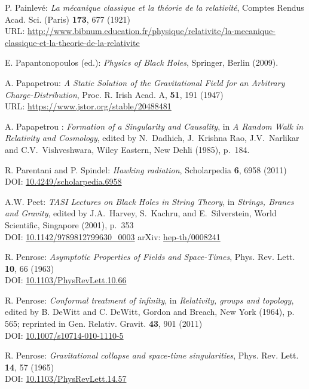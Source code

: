 \begin{thebibliography}{123}
P. Painlevé: \emph{La mécanique classique et la théorie de la relativité},
Comptes Rendus Acad. Sci. (Paris) {\bf 173}, 677 (1921)\\
URL: \url{http://www.bibnum.education.fr/physique/relativite/la-mecanique-classique-et-la-theorie-de-la-relativite}

E. Papantonopoulos (ed.): {\em Physics of Black Holes}, Springer, Berlin (2009).

A. Papapetrou:
{\em A Static Solution of the Gravitational Field for an Arbitrary Charge-Distribution},
Proc. R. Irish Acad. A, {\bf 51}, 191 (1947)\\
URL: \url{https://www.jstor.org/stable/20488481}

A. Papapetrou : {\em Formation of a Singularity and Causality},
in {\em A Random Walk in Relativity and Cosmology},
edited by N.~Dadhich, J.~Krishna Rao, J.V.~Narlikar and C.V.~Vishveshwara,
Wiley Eastern, New Dehli (1985), p.~184.

R. Parentani and P. Spindel:
{\em Hawking radiation},
Scholarpedia {\bf 6}, 6958 (2011)\\
DOI: \href{https://doi.org/10.4249/scholarpedia.6958}{10.4249/scholarpedia.6958}

A.W. Peet:
{\em TASI Lectures on Black Holes in String Theory},
in {\em Strings, Branes and Gravity}, edited by
J.A.~Harvey, S.~Kachru, and E.~Silverstein,
World Scientific, Singapore (2001), p.~353\\
DOI: \href{https://doi.org/10.1142/9789812799630_0003}{10.1142/9789812799630\_0003}\hfill
arXiv: \href{https://arxiv.org/abs/hep-th/0008241}{hep-th/0008241}

R. Penrose: {\em Asymptotic Properties of Fields and Space-Times},
Phys. Rev. Lett. {\bf 10}, 66 (1963)\\
DOI: \href{https://doi.org/10.1103/PhysRevLett.10.66}{10.1103/PhysRevLett.10.66}

R. Penrose: {\em Conformal treatment of infinity}, in {\em Relativity, groups and topology},
edited by B. DeWitt and C. DeWitt,
Gordon and Breach, New York (1964), p. 565; reprinted in
Gen. Relativ. Gravit. {\bf 43}, 901 (2011)\\
DOI: \href{https://doi.org/10.1007/s10714-010-1110-5}{10.1007/s10714-010-1110-5}

R. Penrose: {\em Gravitational collapse and space-time singularities},
Phys. Rev. Lett. {\bf 14}, 57 (1965)\\
DOI: \href{https://doi.org/10.1103/PhysRevLett.14.57}{10.1103/PhysRevLett.14.57}


\end{thebibliography}
